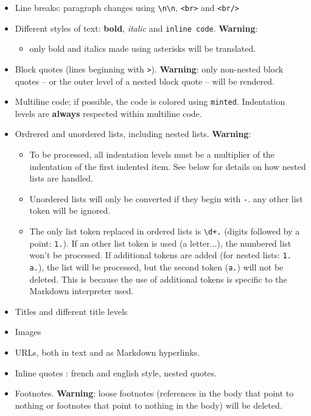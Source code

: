 \documentclass[a4paper, 12pt, twoside]{article}
\begin{document}
\begin{itemize}
\item Line breaks: paragraph changes using \texttt{\textbackslash{}n\textbackslash{}n}, \texttt{<br\textgreater{}} and \texttt{<br/\textgreater{}}
\item Different styles of text: \textbf{bold}, \textit{italic} and \texttt{inline code}. \textbf{Warning}:
\begin{itemize} 
 \item only bold and italics made using asterisks will be translated.
\end{itemize}
\item Block quotes (lines beginning with \texttt{\textgreater{}}). \textbf{Warning}: only non-nested block quotes -- or the outer level of a nested block quote -- will be rendered.
\item Multiline code; if possible, the code is colored using \texttt{minted}. Indentation levels are \textbf{always} respected within multiline code.
\item Ordrered and unordered lists, including nested lists. \textbf{Warning}:
\begin{itemize} 
 \item To be processed, all indentation levels must be a multiplier of the indentation of the first indented item. See below for details on how nested lists are handled.
\item Unordered lists will only be converted if they begin with \texttt{-}. any other list token will be ignored.
\item The only list token replaced in ordered lists is \texttt{\textbackslash{}d+.} (digits followed by a point: \texttt{1.}). If an other list token is used (a letter...), the numbered list won't be processed. If additional tokens are added (for nested lists: \texttt{1. a.}), the list will be processed, but the second token (\texttt{a.}) will not be deleted. This is because the use of additional tokens is specific to the Markdown interpreter used.
\end{itemize}
\item Titles and different title levels
\item Images
\item URLs, both in text and as Markdown hyperlinks.
\item Inline quotes : french and english style, nested quotes.
\item Footnotes. \textbf{Warning}: loose footnotes (references in the body that point to nothing or footnotes that point to nothing in the body) will be deleted. 
\end{itemize}
\end{document}
